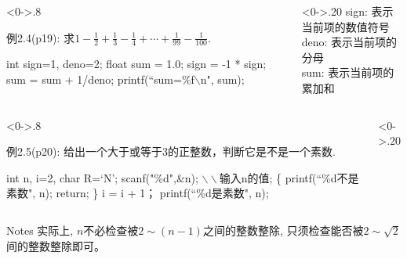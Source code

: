 \begin{frame}%
\begin{columns}%
	\begin{column}<0->{.8\textwidth}
		\begin{algorithm}[H]  
			\caption{例2.4(p19): 求$1-\frac{1}{2}+\frac{1}{3}-\frac{1}{4}+\cdots+\frac{1}{99}-\frac{1}{100}$.} %
			\begin{algorithmic}[1] %
				\State int sign=1, deno=2;
				\State float sum = 1.0; 
				\State sign = -1 * sign;
				\State sum = sum + 1/deno;  
				\EndWhile
				\State printf(``sum=\%f$\backslash$n", sum);	
			\end{algorithmic}  
		\end{algorithm}
	\end{column}%
	\begin{column}<0->{.20\textwidth}
		\newline
		\newline
		sign: 表示当前项的数值符号\\
		deno: 表示当前项的分母\\
		sum:  表示当前项的累加和
	\end{column}%
\end{columns}
\end{frame}

\begin{frame}%
\begin{columns}%
	\begin{column}<0->{.8\textwidth}
		\begin{algorithm}[H]  
			\caption{例2.5(p20): 给出一个大于或等于3的正整数，判断它是不是一个素数.} %
			\begin{algorithmic}[1] %
				\State int n, i=2, char R=`N';
				\State scanf("\%d",\&n); $\backslash\backslash$输入n的值; 
				 \{ printf(``\%d不是素数", n); return; \}
				\EndIf
				\State i = i + 1；
				\EndWhile
				\State printf(``\%d是素数", n);	
			\end{algorithmic}  
		\end{algorithm}
	\end{column}%
	\begin{column}<0->{.20\textwidth}
		\newline
		\newline
	\end{column}%
\end{columns}
\begin{block}{Notes}
	实际上, $n$不必检查被$2\sim(n-1)$之间的整数整除, 只须检查能否被$2\sim\sqrt{2}$间的整数整除即可。
\end{block}
\end{frame}

